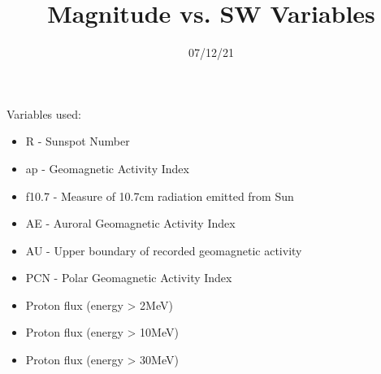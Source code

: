 \documentclass[12pt]{article}
\title{Magnitude vs. SW Variables}
\date{07/12/21}
\begin{document}
\maketitle
\begin{large}
Variables used:

\begin{itemize}
  \item R - Sunspot Number
  \item ap - Geomagnetic Activity Index
  \item f10.7 - Measure of 10.7cm radiation emitted from Sun
  \item AE - Auroral Geomagnetic Activity Index
  \item AU - Upper boundary of recorded geomagnetic activity
  \item PCN - Polar Geomagnetic Activity Index
  \item Proton flux (energy > 2MeV)
  \item Proton flux (energy > 10MeV)
  \item Proton flux (energy > 30MeV)
\end{itemize}
\end{large}

\graphicspath{{../plots/07_12/}}


\newpage
\end{document}
